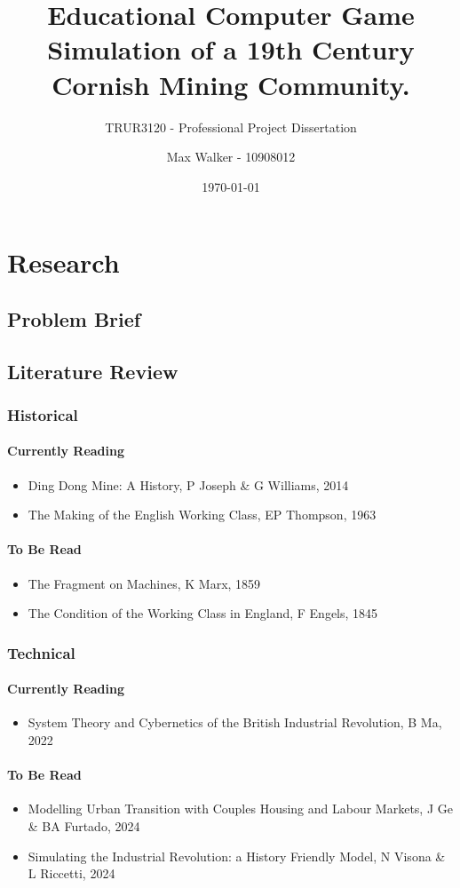 \documentclass[12pt, a4paper]{scrreprt}
\title{Educational Computer Game Simulation of a 19th Century Cornish Mining Community.}
\subtitle{TRUR3120 - Professional Project Dissertation}
\author{Max Walker - 10908012}
\date{\today}
\begin{document}
	\maketitle
	\tableofcontents
	\part{Research}
	\chapter{Problem Brief}
	\chapter{Literature Review}
	\section{Historical}
	\subsection{Currently Reading}
	\begin{itemize}
		\item[] Ding Dong Mine: A History, P Joseph \& G Williams, 2014
		\item[] The Making of the English Working Class, EP Thompson, 1963
	\end{itemize}
	\subsection{To Be Read}
	\begin{itemize}
		\item[] The Fragment on Machines, K Marx, 1859
		\item[] The Condition of the Working Class in England, F Engels, 1845
	\end{itemize}
	\section{Technical}
	\subsection{Currently Reading}
	\begin{itemize}
		\item[] System Theory and Cybernetics of the British Industrial Revolution, B Ma, 2022
	\end{itemize}
	\subsection{To Be Read}
	\begin{itemize}
		\item[] Modelling Urban Transition with Couples Housing and Labour Markets, J Ge \& BA Furtado, 2024
		\item[] Simulating the Industrial Revolution: a History Friendly Model, N Visona \& L Riccetti, 2024
	\end{itemize}
\end{document}
